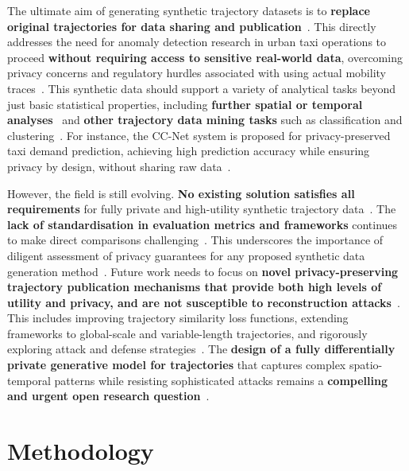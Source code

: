 \documentclass[runningheads]{llncs}
\begin{document}
The ultimate aim of generating synthetic trajectory datasets is to \textbf{replace original trajectories for data sharing and publication}~\cite{Buchholz2024SoK,Rao2021LSTMTrajGAN,Liu2018TrajGANs}. This directly addresses the need for anomaly detection research in urban taxi operations to proceed \textbf{without requiring access to sensitive real-world data}, overcoming privacy concerns and regulatory hurdles associated with using actual mobility traces~\cite{Buchholz2024SoK,Rao2021LSTMTrajGAN,Liu2018TrajGANs}. This synthetic data should support a variety of analytical tasks beyond just basic statistical properties, including \textbf{further spatial or temporal analyses}~\cite{Rao2021LSTMTrajGAN,Chen2011DPTP} and \textbf{other trajectory data mining tasks} such as classification and clustering~\cite{Rao2021LSTMTrajGAN,Chen2011DPTP}. For instance, the CC-Net system is proposed for privacy-preserved taxi demand prediction, achieving high prediction accuracy while ensuring privacy by design, without sharing raw data~\cite{Ozeki2023PPTP}.

However, the field is still evolving. \textbf{No existing solution satisfies all requirements} for fully private and high-utility synthetic trajectory data~\cite{Buchholz2024SoK}. The \textbf{lack of standardisation in evaluation metrics and frameworks} continues to make direct comparisons challenging~\cite{Primault2019LongRoad,Jin2023SurveyExpStudy}. This underscores the importance of diligent assessment of privacy guarantees for any proposed synthetic data generation method~\cite{Buchholz2024SoK}. Future work needs to focus on \textbf{novel privacy-preserving trajectory publication mechanisms that provide both high levels of utility and privacy, and are not susceptible to reconstruction attacks}~\cite{Buchholz2022RAoPT,Buchholz2024SoK,Primault2019LongRoad}. This includes improving trajectory similarity loss functions, extending frameworks to global-scale and variable-length trajectories, and rigorously exploring attack and defense strategies~\cite{Rao2021LSTMTrajGAN}. The \textbf{design of a fully differentially private generative model for trajectories} that captures complex spatio-temporal patterns while resisting sophisticated attacks remains a \textbf{compelling and urgent open research question}~\cite{Buchholz2024SoK,Buchholz2022RAoPT}.


\section{Methodology}
\label{sec:methodology}
\end{document}
